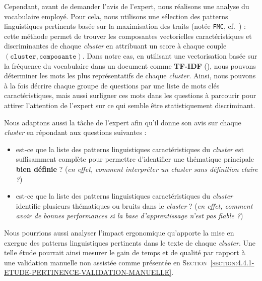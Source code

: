 			Cependant, avant de demander l'avis de l'expert, nous réalisons une analyse du vocabulaire employé.
			Pour cela, nous utilisons une sélection des patterns linguistiques pertinents basée sur la maximisation des traits (notée \texttt{FMC}, cf.~\cite{lamirel-etal:2017:novel-approach-feature}) : cette méthode permet de trouver les composantes vectorielles caractéristiques et discriminantes de chaque \textit{cluster} en attribuant un score à chaque couple $(\texttt{cluster}, \texttt{composante})$.
			Dans notre cas, en utilisant une vectorisation basée sur la fréquence du vocabulaire dans un document comme \textbf{TF-IDF} (\cite{sparck-jones:1972:statistical-interpretation-term}), nous pouvons déterminer les mots les plus représentatifs de chaque \textit{cluster}.
			Ainsi, nous pouvons à la fois décrire chaque groupe de questions par une liste de mots clés caractéristiques, mais aussi surligner ces mots dans les questions à parcourir pour attirer l'attention de l'expert sur ce qui semble être statistiquement discriminant.
			
			Nous adaptons aussi la tâche de l'expert afin qu'il donne son avis sur chaque \textit{cluster} en répondant aux questions suivantes :
			\begin{itemize}
				\item est-ce que la liste des patterns linguistiques caractéristiques du \textit{cluster} est suffisamment complète pour permettre d'identifier une thématique principale \textbf{bien définie} ? (\textit{en effet, comment interpréter un cluster sans définition claire ?})
				\item est-ce que la liste des patterns linguistiques caractéristiques du \textit{cluster} identifie plusieurs thématiques ou bruits dans le \textit{cluster} ? (\textit{en effet, comment avoir de bonnes performances si la base d'apprentissage n'est pas fiable ?})
			\end{itemize}
			
			\begin{leftBarIdea}
				Nous pourrions aussi analyser l'impact ergonomique qu'apporte la mise en exergue des patterns linguistiques pertinents dans le texte de chaque \textit{cluster}.
				Une telle étude pourrait ainsi mesurer le gain de temps et de qualité par rapport à une validation manuelle non assistée comme présentée en \textsc{Section~\ref{section:4.4.1-ETUDE-PERTINENCE-VALIDATION-MANUELLE}}.
			\end{leftBarIdea}
			
